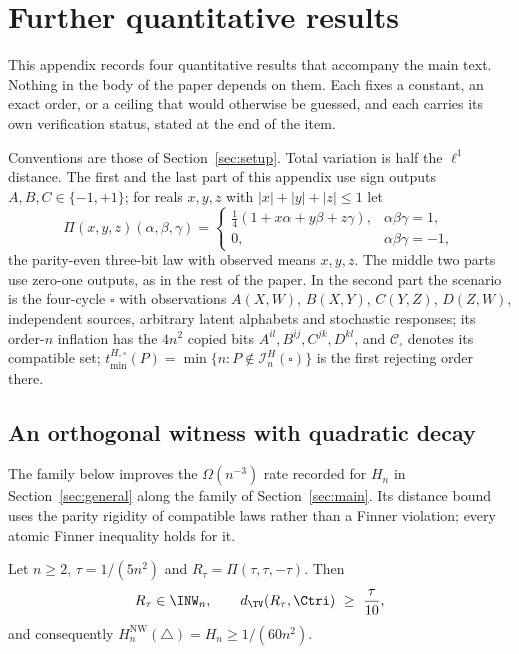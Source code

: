 \providecommand{\Csq}{\mathcal C_{\square}}
\providecommand{\Cpar}{\mathcal C_{\mathrm{par}}}
\providecommand{\Par}[3]{\Pi(#1,#2,#3)}
\providecommand{\tminsq}[1]{t_{\min}^{#1,\square}}

\section{Further quantitative results}\label{app:supporting}

This appendix records four quantitative results that accompany the main text. Nothing in the body of the paper depends on them. Each fixes a constant, an exact order, or a ceiling that would otherwise be guessed, and each carries its own verification status, stated at the end of the item.

Conventions are those of Section~\ref{sec:setup}. Total variation is half the $\ell^1$ distance. The first and the last part of this appendix use sign outputs $A,B,C\in\{-1,+1\}$; for reals $x,y,z$ with $|x|+|y|+|z|\le1$ let
\[
\Par xyz(\alpha,\beta,\gamma)=
\begin{cases}
\tfrac14(1+x\alpha+y\beta+z\gamma), & \alpha\beta\gamma=1,\\
0,&\alpha\beta\gamma=-1,
\end{cases}
\]
the parity-even three-bit law with observed means $x,y,z$. The middle two parts use zero-one outputs, as in the rest of the paper. In the second part the scenario is the four-cycle $\square$ with observations $A(X,W)$, $B(X,Y)$, $C(Y,Z)$, $D(Z,W)$, independent sources, arbitrary latent alphabets and stochastic responses; its order-$n$ inflation has the $4n^2$ copied bits $A^{il},B^{ij},C^{jk},D^{kl}$, and $\Csq$ denotes its compatible set; $\tminsq H(P)=\min\{n:P\notin\mathcal I^H_n(\square)\}$ is the first rejecting order there.

\subsection*{An orthogonal witness with quadratic decay}

The family below improves the $\Omega(n^{-3})$ rate recorded for $H_n$ in Section~\ref{sec:general} along the family of Section~\ref{sec:main}. Its distance bound uses the parity rigidity of compatible laws rather than a Finner violation; every atomic Finner inequality holds for it.

\begin{proposition}\label{prop:orthwitness}
Let $n\ge2$, $\tau=1/(5n^2)$ and $R_\tau=\Par\tau\tau{-\tau}$. Then
\[
R_\tau\in\INW_n,\qquad d_{\TV}(R_\tau,\Ctri)\ \ge\ \frac\tau{10},
\]
and consequently $H_n^{\mathrm{NW}}(\triangle)=H_n\ge 1/(60n^2)$.
\end{proposition}

